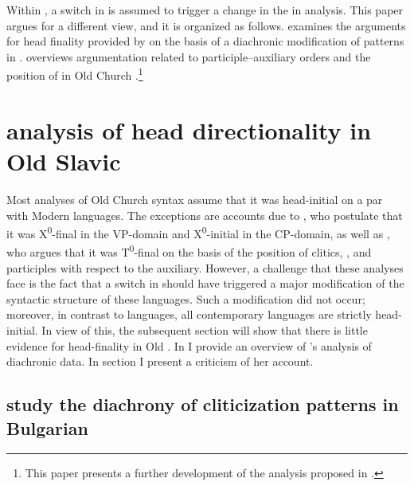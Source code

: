 \documentclass[output=paper,modfonts,newtxmath,hidelinks]{langscibook}
\begin{document}
Within , a switch in  is assumed to trigger a change in the  in  analysis. This paper argues for a different view, and it is organized as follows.  examines the arguments for head finality provided by \citet{pancheva2005} on the basis of a diachronic modification of  patterns in .  overviews  argumentation related to participle--auxiliary orders and the position of  in Old Church .\footnote{This paper presents a further development of the analysis proposed in \citet{migdalski2016}.}

\section{ analysis of head directionality in Old Slavic}\label{11:s2}

\sloppy Most analyses of Old Church  syntax \citep{willis2000,jung2015,jung-migdalski2015,migdalski2016} assume that it was head-initial on a par with Modern  languages. The exceptions are accounts due to \citet{dimitrovavulchanova-vulchanov2008}, who postulate that it was X\textsuperscript{0}{}-final in the VP-domain and X\textsuperscript{0}{}-initial in the CP-domain, as well as \citet{pancheva2005,pancheva2008}, who argues that it was T\textsuperscript{0}{}-final on the basis of the position of  clitics, , and participles with respect to the auxiliary. However, a challenge that these analyses face is the fact that a switch in  should have triggered a major modification of the syntactic structure of these languages. Such a modification did not occur; moreover, in contrast to  languages, all contemporary  languages are strictly head-initial. In view of this, the subsequent section will show that there is little evidence for head-finality in Old . In  I provide an overview of \citeauthor{pancheva2005}'s analysis of diachronic  data. In section  I present a criticism of her account.

\subsection{ study the diachrony of cliticization patterns in Bulgarian}\label{11:s2.1} 
\end{document}
